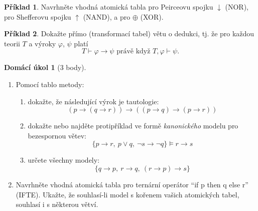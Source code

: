 \documentclass[a4paper]{article}
\theoremstyle{definition}
\newtheorem{problem}{Příklad}
\newtheorem*{ukol}{Domácí úkol}
\begin{document}
\medskip\begin{problem} 
    Navrhněte vhodná atomická tabla pro Peirceovu spojku $\downarrow$ (NOR), pro Shefferovu spojku $\uparrow$ (NAND), a pro $\oplus$ (XOR).
\end{problem}


\medskip\begin{problem}
Dokažte přímo (transformací tabel) větu o dedukci, tj. že pro každou teorii $T$ a výroky $\varphi$, $\psi$ platí
$$T \vdash \varphi\to \psi\text{\ \ právě když\ \ }T,\varphi \vdash \psi.$$
\end{problem}\medskip


\medskip\begin{ukol}[3 body]{\,}

\begin{enumerate}[label=\arabic*.]
\item Pomocí tablo metody:
\begin{enumerate}
    \item dokažte, že následující výrok je tautologie: 
    $$(p \to (q \to r)) \to ((p\to q)\to (p \to r))$$
    \item dokažte nebo najděte protipříklad ve formě \emph{kanonického} modelu pro bezespornou větev:
    $$\{ p \to r,\ p \vee q,\ \neg s \to \neg q\} \models r \to s$$
    \item určete všechny modely:
    $$\{ q \to p,\ r \to q,\ (r \to p) \to s\}$$
\end{enumerate}
\item Navrhněte vhodná atomická tabla pro ternární operátor ``if p then q else r'' (IFTE). Ukažte, že souhlasí-li model s kořenem vašich atomických tabel, souhlasí i s některou větví.
\end{enumerate} 
\end{ukol}
\end{document}

